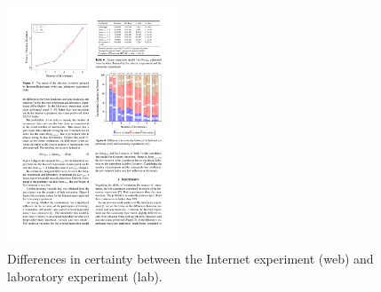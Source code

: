 \begin{figure}[t]
\centering
\vspace{2.5pt}

\includegraphics[width=0.45\textwidth]{Chapters/07_Analysis_Experiment/ismir/plotdata/certainty.pdf}
\caption{Differences in certainty between the Internet experiment (web) and laboratory experiment (lab).}
\label{figure:certainty_web_iis}
\end{figure}

